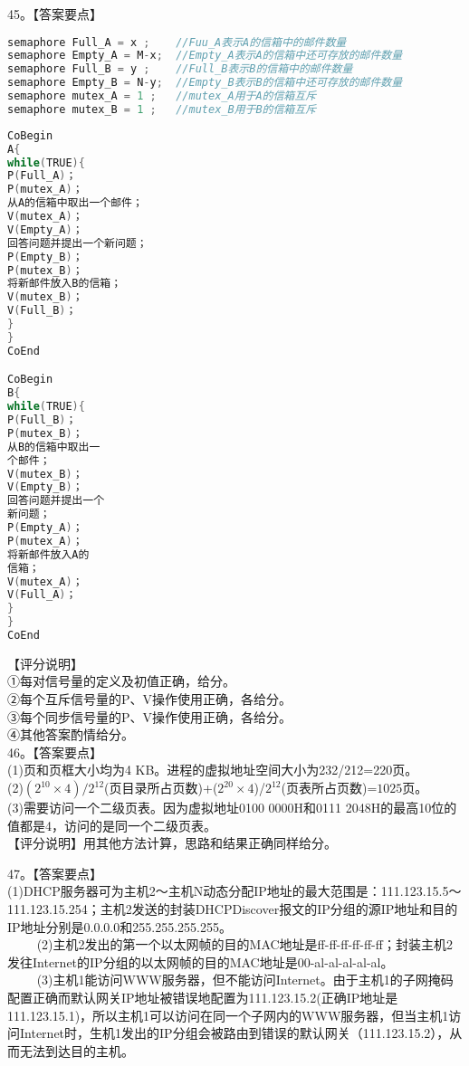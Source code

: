 45。【答案要点】\\
\begin{lstlisting}[language=cpp]
semaphore Full_A = x ;    //Fuu_A表示A的信箱中的邮件数量
semaphore Empty_A = M-x;  //Empty_A表示A的信箱中还可存放的邮件数量
semaphore Full_B = y ;    //Full_B表示B的信箱中的邮件数量
semaphore Empty_B = N-y;  //Empty_B表示B的信箱中还可存放的邮件数量
semaphore mutex_A = 1 ;   //mutex_A用于A的信箱互斥
semaphore mutex_B = 1 ;   //mutex_B用于B的信箱互斥
\end{lstlisting}
\begin{lstlisting}[language=cpp]
CoBegin
A{
while(TRUE){
P(Full_A)；
P(mutex_A)；
从A的信箱中取出一个邮件；
V(mutex_A)；
V(Empty_A)；
回答问题并提出一个新问题；
P(Empty_B)；
P(mutex_B)；
将新邮件放入B的信箱；
V(mutex_B)；
V(Full_B)；
}
}
CoEnd

CoBegin
B{
while(TRUE){
P(Full_B)；
P(mutex_B)；
从B的信箱中取出一
个邮件；
V(mutex_B)；
V(Empty_B)；
回答问题并提出一个
新问题；
P(Empty_A)；
P(mutex_A)；
将新邮件放入A的
信箱；
V(mutex_A)；
V(Full_A)；
}
}
CoEnd
\end{lstlisting}
【评分说明】\\
①每对信号量的定义及初值正确，给分。\\
②每个互斥信号量的P、V操作使用正确，各给分。\\
③每个同步信号量的P、V操作使用正确，各给分。\\
④其他答案酌情给分。\\

46。【答案要点】\\
(1)页和页框大小均为4 KB。进程的虚拟地址空间大小为232/212=220页。\\
(2)$(2^{10}\times4)/2^{12}$(页目录所占页数)+($2^{20}\times4$)/$2^{12}$(页表所占页数)=$1025$页。\\
(3)需要访问一个二级页表。因为虚拟地址0100 0000H和0111 2048H的最高10位的值都是4，访问的是同一个二级页表。\\
【评分说明】用其他方法计算，思路和结果正确同样给分。

47。【答案要点】\\
(1)DHCP服务器可为主机2～主机N动态分配IP地址的最大范围是：111.123.15.5～111.123.15.254；主机2发送的封装DHCPDiscover报文的IP分组的源IP地址和目的IP地址分别是0.0.0.0和255.255.255.255。\\
$\qquad$ (2)主机2发出的第一个以太网帧的目的MAC地址是ff-ff-ff-ff-ff-ff；封装主机2发往Internet的IP分组的以太网帧的目的MAC地址是00-al-al-al-al-al。\\
$\qquad$ (3)主机1能访问WWW服务器，但不能访问Internet。由于主机1的子网掩码配置正确而默认网关IP地址被错误地配置为111.123.15.2(正确IP地址是111.123.15.1)，所以主机1可以访问在同一个子网内的WWW服务器，但当主机1访问Internet时，生机1发出的IP分组会被路由到错误的默认网关（111.123.15.2），从而无法到达目的主机。